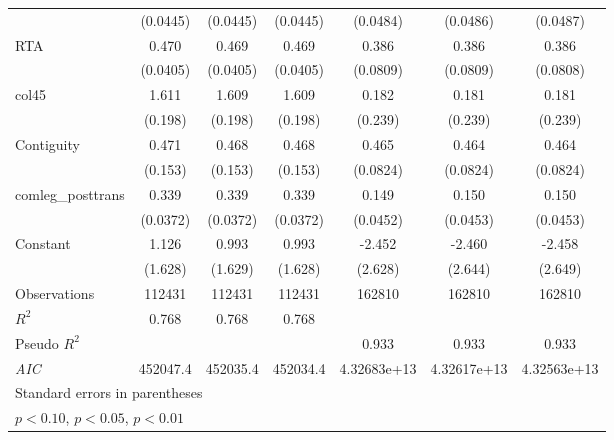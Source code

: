 {\begin{tabular}{l*{6}{c}}
                    &    (0.0445)         &    (0.0445)         &    (0.0445)         &    (0.0484)         &    (0.0486)         &    (0.0487)         \\
[1em]
RTA                 &       0.470\sym{***}&       0.469\sym{***}&       0.469\sym{***}&       0.386\sym{***}&       0.386\sym{***}&       0.386\sym{***}\\
                    &    (0.0405)         &    (0.0405)         &    (0.0405)         &    (0.0809)         &    (0.0809)         &    (0.0808)         \\
[1em]
col45               &       1.611\sym{***}&       1.609\sym{***}&       1.609\sym{***}&       0.182         &       0.181         &       0.181         \\
                    &     (0.198)         &     (0.198)         &     (0.198)         &     (0.239)         &     (0.239)         &     (0.239)         \\
[1em]
Contiguity          &       0.471\sym{***}&       0.468\sym{***}&       0.468\sym{***}&       0.465\sym{***}&       0.464\sym{***}&       0.464\sym{***}\\
                    &     (0.153)         &     (0.153)         &     (0.153)         &    (0.0824)         &    (0.0824)         &    (0.0824)         \\
[1em]
comleg\_posttrans    &       0.339\sym{***}&       0.339\sym{***}&       0.339\sym{***}&       0.149\sym{***}&       0.150\sym{***}&       0.150\sym{***}\\
                    &    (0.0372)         &    (0.0372)         &    (0.0372)         &    (0.0452)         &    (0.0453)         &    (0.0453)         \\
[1em]
Constant            &       1.126         &       0.993         &       0.993         &      -2.452         &      -2.460         &      -2.458         \\
                    &     (1.628)         &     (1.629)         &     (1.628)         &     (2.628)         &     (2.644)         &     (2.649)         \\
\hline
Observations        &      112431         &      112431         &      112431         &      162810         &      162810         &      162810         \\
\(R^{2}\)           &       0.768         &       0.768         &       0.768         &                     &                     &                     \\
Pseudo \(R^{2}\)    &                     &                     &                     &       0.933         &       0.933         &       0.933         \\
\textit{AIC}        &    452047.4         &    452035.4         &    452034.4         & 4.32683e+13         & 4.32617e+13         & 4.32563e+13         \\
\hline\hline
\multicolumn{7}{l}{\footnotesize Standard errors in parentheses}\\
\multicolumn{7}{l}{\footnotesize \sym{*} \(p<0.10\), \sym{**} \(p<0.05\), \sym{***} \(p<0.01\)}\\
\end{tabular}
}
